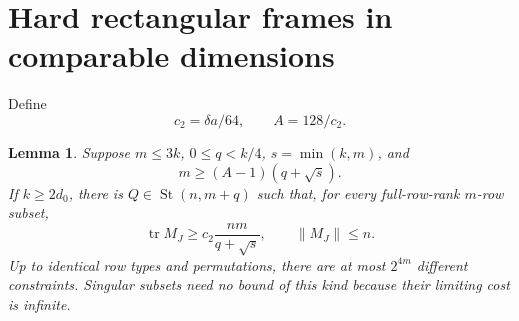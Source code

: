 \documentclass[11pt]{article}
\newtheorem{lemma}[theorem]{Lemma}
\theoremstyle{remark}\newtheorem{remark}[theorem]{Remark}
\newcommand{\tr}{\operatorname{tr}}
\newcommand{\St}{\operatorname{St}}
\begin{document}
\section{Hard rectangular frames in comparable dimensions}\label{sec:frames}
Define
\begin{equation}\label{eq:frameconstants}
 c_2=\delta a/64,\qquad A=128/c_2.
\end{equation}
\begin{lemma}\label{le:frame}
Suppose $m\le3k$, $0\le q<k/4$, $s=\min(k,m)$, and
\begin{equation}\label{eq:feasibility}
 m\ge(A-1)(q+\sqrt{s}).
\end{equation}
If $k\ge2d_0$, there is $Q\in\St(n,m+q)$ such that, for every full-row-rank $m$-row subset,
\begin{equation}\label{eq:framebound}
 \tr M_J\ge c_2\frac{nm}{q+\sqrt{s}},\qquad \|M_J\|\le n.
\end{equation}
Up to identical row types and permutations, there are at most $2^{4m}$ different constraints. Singular subsets need no bound of this kind because their limiting cost is infinite.
\end{lemma}
\end{document}
